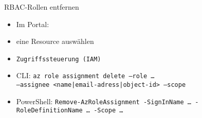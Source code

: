 \begin{flashcard}[Definition]{RBAC-Rollen entfernen}
    \begin{itemize}
        \item Im Portal:\newline
            \item eine Resource auswählen
            \item \texttt{Zugriffssteuerung (IAM)}
        \item CLI:\newline
            \texttt{az role assignment delete --role \ldots\\--assignee <name|email-adress|object-id> --scope}
        \item PowerShell:\newline
            \texttt{Remove-AzRoleAssignment -SignInName \ldots\ -RoleDefinitionName \ldots\ -Scope \ldots}
    \end{itemize}
\end{flashcard}
